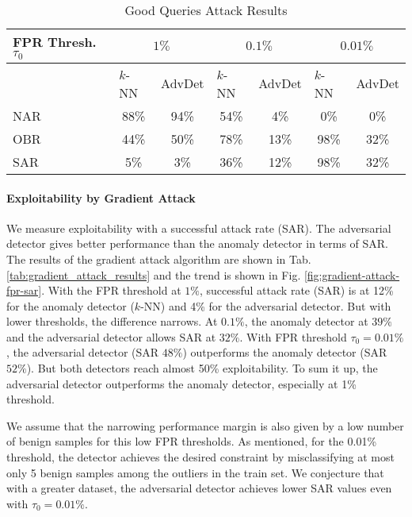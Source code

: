 \begin{table}[h]
\centering

    \begin{tabular}{|l||c|c|c|c|c|c|}
    \hline
    FPR Thresh. $\tau_0$        & \multicolumn{2}{c|}{$1\%$}              & \multicolumn{2}{c|}{$0.1\%$}            & \multicolumn{2}{c|}{$0.01\%$}           \\ \hline
                              & \multicolumn{1}{l|}{$k$-NN} & AdvDet & \multicolumn{1}{l|}{$k$-NN} & AdvDet & \multicolumn{1}{l|}{$k$-NN} & AdvDet \\ \hline\hline
    NAR & 88\% & 94\% & 54\% & 4\% & 0\% & 0\% \\ \hline
    OBR & 44\% & 50\% & 78\% & 13\% & 98\% & 32\% \\ \hline
    SAR & 5\% & 3\% & 36\% & 12\% & 98\% & 32\% \\ \hline
    \end{tabular}

    \caption{Good Queries Attack Results}
    \label{tab:good_queries_attack_results}

\end{table}

\paragraph{Exploitability by Gradient Attack}
We measure exploitability with a successful attack rate (SAR). The adversarial detector gives better performance than the anomaly detector in terms of SAR. The results of the gradient attack algorithm are shown in Tab. \ref{tab:gradient_attack_results} and the trend is shown in Fig. \ref{fig:gradient-attack-fpr-sar}. With the FPR threshold at $1\%$, successful attack rate (SAR) is at 12\% for the anomaly detector ($k$-NN) and 4\% for the adversarial detector.
But with lower thresholds, the difference narrows. At $0.1 \%$, the anomaly detector at $39 \%$ and the adversarial detector allows SAR at $32 \%$. With FPR threshold $\tau_0 = 0.01 \%$, the adversarial detector (SAR $48 \%$) outperforms the anomaly detector (SAR $52 \%$). But both detectors reach almost 50\% exploitability. To sum it up, the adversarial detector outperforms the anomaly detector, especially at 1\% threshold.

We assume that the narrowing performance margin is also given by a low number of benign samples for this low FPR thresholds. As mentioned, for the 0.01\% threshold, the detector achieves the desired constraint by misclassifying at most only 5 benign samples among the outliers in the train set. We conjecture that with a greater dataset, the adversarial detector achieves lower SAR values even with $\tau_0 = 0.01\%$.


